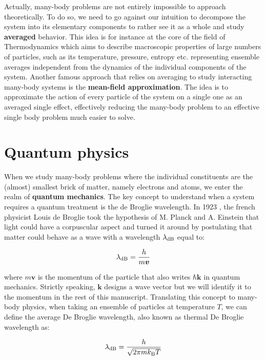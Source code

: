 Actually, many-body problems are not entirely impossible to approach theoretically. To do so, we need to go against our intuition to decompose the system into its elementary components to rather see it as a whole and study \textbf{averaged} behavior. This idea is for instance at the core of the field of Thermodynamics which aims to describe macroscopic properties of large numbers of particles, such as its temperature, pressure, entropy etc. representing ensemble averages independent from the dynamics of the individual components of the system. Another famous approach that relies on averaging to study interacting many-body systems is the \textbf{mean-field approximation}. The idea is to approximate the action of every particle of the system on a single one as an averaged single effect, effectively reducing the many-body problem to an effective single body problem much easier to solve.

\section*{Quantum physics}

When we study many-body problems where the individual constituents are the (almost) smallest brick of matter, namely electrons and atoms, we enter the realm of \textbf{quantum mechanics}. The key concept to understand when a system requires a quantum treatment is the de Broglie wavelength. In 1923 \cite{debroglie:tel-00006807}, the french physicist Louis de Broglie took the hypothesis of M. Planck and A. Einstein that light could have a corpuscular aspect and turned it around by postulating that matter could behave as a wave with a wavelength $\lambda_{\rm{dB}}$ equal to:

\begin{equation}
    \lambda_{\rm{dB}} = \frac{h}{m\bm{v}}
\end{equation}

\noindent where $m\bm{v}$ is the momentum of the particle that also writes $\hbar \bm{k}$ in quantum mechanics. Strictly speaking, $\bm{k}$ designs a wave vector but we will identify it to the momentum in the rest of this manuscript. Translating this concept to many-body physics, when taking an ensemble of particles at temperature $T$, we can define the average De Broglie wavelength, also known as thermal De Broglie wavelength as:

\begin{equation}
    \lambda_{\rm{dB}} = \frac{h}{\sqrt{2 \pi m k_{\mathrm{B}} T}}
\end{equation}

